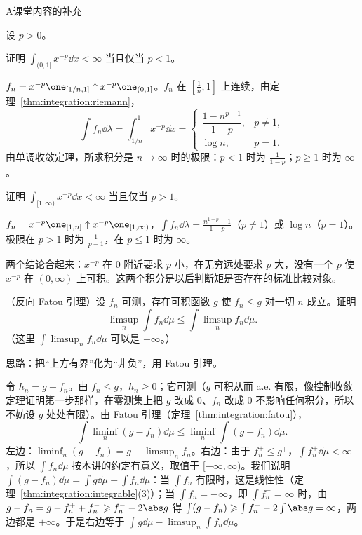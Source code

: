 \begin{exercises}{A}{课堂内容的补充}
\item\label{ex:integration:A10} 设 $p>0$。
\begin{questions}
\item 证明 $\int_{(0,1]}x^{-p}\dd x<\infty$ 当且仅当 $p<1$。
\begin{solution}
$f_n=x^{-p}\one_{[1/n,1]}\uparrow x^{-p}\one_{(0,1]}$。$f_n$ 在 $[\frac1n,1]$ 上连续，由定理~\ref{thm:integration:riemann}，
\[
\int f_n\dd\lambda=\int_{1/n}^1x^{-p}\dd x=\begin{cases}\dfrac{1-n^{p-1}}{1-p},&p\neq1,\\[1ex] \log n,&p=1.\end{cases}
\]
由单调收敛定理，所求积分是 $n\to\infty$ 时的极限：$p<1$ 时为 $\frac1{1-p}$；$p\geqslant1$ 时为 $\infty$。
\end{solution}
\item 证明 $\int_{[1,\infty)}x^{-p}\dd x<\infty$ 当且仅当 $p>1$。
\begin{solution}
$f_n=x^{-p}\one_{[1,n]}\uparrow x^{-p}\one_{[1,\infty)}$，$\int f_n\dd\lambda=\frac{n^{1-p}-1}{1-p}$（$p\neq1$）或 $\log n$（$p=1$）。极限在 $p>1$ 时为 $\frac1{p-1}$，在 $p\leqslant1$ 时为 $\infty$。

两个结论合起来：$x^{-p}$ 在 $0$ 附近要求 $p$ 小，在无穷远处要求 $p$ 大，没有一个 $p$ 使 $x^{-p}$ 在 $(0,\infty)$ 上可积。这两个积分是以后判断矩是否存在的标准比较对象。
\end{solution}
\end{questions}

\item\label{ex:integration:A11} （反向 Fatou 引理）设 $f_n$ 可测，存在可积函数 $g$ 使 $f_n\leqslant g$ 对一切 $n$ 成立。证明
\[
\limsup_n\int f_n\dd\mu\leqslant\int\limsup_nf_n\dd\mu .
\]
（这里 $\int\limsup_nf_n\dd\mu$ 可以是 $-\infty$。）
\begin{solution}
思路：把“上方有界”化为“非负”，用 Fatou 引理。

令 $h_n=g-f_n$。由 $f_n\leqslant g$，$h_n\geqslant0$；它可测（$g$ 可积从而 a.e. 有限，像控制收敛定理证明第一步那样，在零测集上把 $g$ 改成 $0$、$f_n$ 改成 $0$ 不影响任何积分，所以不妨设 $g$ 处处有限）。由 Fatou 引理（定理~\ref{thm:integration:fatou}），
\[
\int\liminf_n(g-f_n)\dd\mu\leqslant\liminf_n\int(g-f_n)\dd\mu .
\]
左边：$\liminf_n(g-f_n)=g-\limsup_nf_n$。右边：由于 $f_n^+\leqslant g^+$，$\int f_n^+\dd\mu<\infty$，所以 $\int f_n\dd\mu$ 按本讲的约定有意义，取值于 $[-\infty,\infty)$。我们说明 $\int(g-f_n)\dd\mu=\int g\dd\mu-\int f_n\dd\mu$：当 $\int f_n$ 有限时，这是线性性（定理~\ref{thm:integration:integrable}(3)）；当 $\int f_n=-\infty$，即 $\int f_n^-=\infty$ 时，由 $g-f_n=g-f_n^++f_n^-\geqslant f_n^--2\abs g$ 得 $\int(g-f_n)\geqslant\int f_n^--2\int\abs g=\infty$，两边都是 $+\infty$。于是右边等于 $\int g\dd\mu-\limsup_n\int f_n\dd\mu$。


\end{solution}
\end{exercises}
